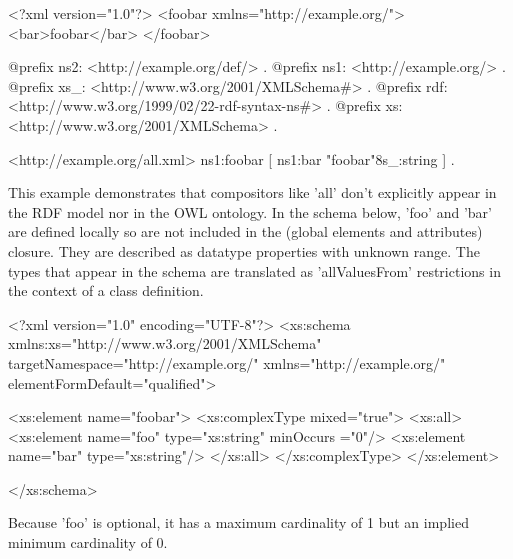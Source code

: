 \begin{DoxyCodeInclude}
<?xml version="1.0"?>
<foobar xmlns="http://example.org/">
        <bar>foobar</bar>
</foobar>


\end{DoxyCodeInclude}
 
\begin{DoxyCodeInclude}
@prefix ns2:     <http://example.org/def/> .
@prefix ns1:     <http://example.org/> .
@prefix xs_:     <http://www.w3.org/2001/XMLSchema#> .
@prefix rdf:     <http://www.w3.org/1999/02/22-rdf-syntax-ns#> .
@prefix xs:      <http://www.w3.org/2001/XMLSchema> .

<http://example.org/all.xml>
      ns1:foobar
              [ ns1:bar "foobar"^^xs_:string
              ] .
\end{DoxyCodeInclude}


This example demonstrates that compositors like 'all' don't explicitly appear in the RDF model nor in the OWL ontology. In the schema below, 'foo' and 'bar' are defined locally so are not included in the (global elements and attributes) closure. They are described as datatype properties with unknown range. The types that appear in the schema are translated as 'allValuesFrom' restrictions in the context of a class definition.


\begin{DoxyCodeInclude}
<?xml version="1.0" encoding="UTF-8"?>
<xs:schema xmlns:xs="http://www.w3.org/2001/XMLSchema" 
        targetNamespace="http://example.org/" xmlns="http://example.org/" 
        elementFormDefault="qualified">

        <xs:element name="foobar">
                <xs:complexType mixed="true">
                        <xs:all>
                                <xs:element name="foo" type="xs:string" minOccurs
      ="0"/>
                                <xs:element name="bar" type="xs:string"/>
                        </xs:all>
                </xs:complexType>
        </xs:element>

</xs:schema>
\end{DoxyCodeInclude}


Because 'foo' is optional, it has a maximum cardinality of 1 but an implied minimum cardinality of 0.



